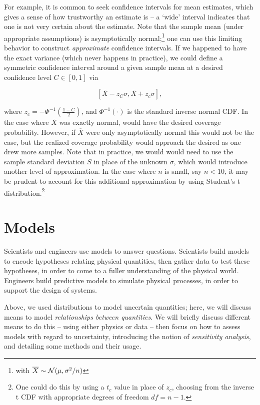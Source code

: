 \documentclass[../primer.tex]{subfiles}
\begin{document}
For example, it is common to seek confidence intervals for mean estimates, which
gives a sense of how trustworthy an estimate is -- a `wide' interval indicates
that one is not very certain about the estimate. Note that the sample mean
(under appropriate assumptions) is asymptotically normal;\footnote{with
  $\overline{X} \sim \mathcal{N}(\mu, \sigma^2/n)$} one can use this limiting behavior
to construct \emph{approximate} confidence intervals. If we happened to have the
exact variance (which never happens in practice), we could define a symmetric
confidence interval around a given sample mean at a desired confidence level
$C\in[0,1]$ via

\begin{equation} \label{eq:mean-ci}
  [\overline{X} - z_C \sigma, \overline{X} + z_c \sigma],
\end{equation}

\noindent where $z_c = - \Phi^{-1}(\frac{1-C}{2})$, and $\Phi^{-1}(\cdot)$ is
the standard inverse normal CDF. In the case where $\overline{X}$ was exactly
normal,  would have the desired coverage probability. However,
if $\overline{X}$ were only asymptotically normal this would not be the case,
but the realized coverage probability would approach the desired as one drew
more samples. Note that in practice, we would would need to use the sample
standard deviation $S$ in place of the unknown $\sigma$, which would introduce
another level of approximation. In the case where $n$ is small, say $n < 10$, it
may be prudent to account for this additional approximation by using Student's t
distribution.\footnote{One could do this by using a $t_c$ value in place of
  $z_c$, choosing from the inverse t CDF with appropriate degrees of freedom $df
  = n - 1$.}

\section{Models} \label{sec:models}
Scientists and engineers use models to answer questions. Scientists build models
to encode hypotheses relating physical quantities, then gather data to test
these hypotheses, in order to come to a fuller understanding of the physical
world. Engineers build predictive models to simulate physical processes, in
order to support the design of systems.

Above, we used distributions to model uncertain quantities; here, we will
discuss means to model \emph{relationships between quantities}. We will briefly
discuss different means to do this -- using either physics or data -- then focus
on how to assess models with regard to uncertainty, introducing the notion of
\emph{sensitivity analysis}, and detailing some methods and their usage.
\end{document}
